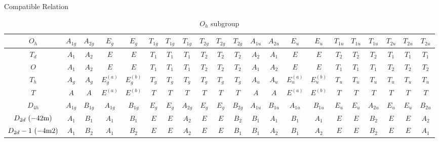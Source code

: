 \documentclass[fleqn,10pt,landscape]{jsarticle}
\begin{document}
\setcounter{MaxMatrixCols}{16}

\begin{center}
\LARGE
Compatible Relation
\end{center}
\begin{table}[ht!]
\begin{center}
\caption{$O_{h}$ subgroup}
\renewcommand{\arraystretch}{1.0}
\begin{tabular}{ccccccccccccccccccccc} \hline \hline
$ O_{h} $ & $ A_{1g} $ & $ A_{2g} $ & $ E_{g} $ & $ E_{g} $ & $ T_{1g} $ & $ T_{1g} $ & $ T_{1g} $ & $ T_{2g} $ & $ T_{2g} $ & $ T_{2g} $ & $ A_{1u} $ & $ A_{2u} $ & $ E_{u} $ & $ E_{u} $ & $ T_{1u} $ & $ T_{1u} $ & $ T_{1u} $ & $ T_{2u} $ & $ T_{2u} $ & $ T_{2u} $ \\ \hline
$ T_{d} $ & $ A_{1} $ & $ A_{2} $ & $ E $ & $ E $ & $ T_{1} $ & $ T_{1} $ & $ T_{1} $ & $ T_{2} $ & $ T_{2} $ & $ T_{2} $ & $ A_{2} $ & $ A_{1} $ & $ E $ & $ E $ & $ T_{2} $ & $ T_{2} $ & $ T_{2} $ & $ T_{1} $ & $ T_{1} $ & $ T_{1} $ \\
$ O $ & $ A_{1} $ & $ A_{2} $ & $ E $ & $ E $ & $ T_{1} $ & $ T_{1} $ & $ T_{1} $ & $ T_{2} $ & $ T_{2} $ & $ T_{2} $ & $ A_{1} $ & $ A_{2} $ & $ E $ & $ E $ & $ T_{1} $ & $ T_{1} $ & $ T_{1} $ & $ T_{2} $ & $ T_{2} $ & $ T_{2} $ \\
$ T_{h} $ & $ A_{g} $ & $ A_{g} $ & $ E_{g}^{(a)} $ & $ E_{g}^{(b)} $ & $ T_{g} $ & $ T_{g} $ & $ T_{g} $ & $ T_{g} $ & $ T_{g} $ & $ T_{g} $ & $ A_{u} $ & $ A_{u} $ & $ E_{u}^{(a)} $ & $ E_{u}^{(b)} $ & $ T_{u} $ & $ T_{u} $ & $ T_{u} $ & $ T_{u} $ & $ T_{u} $ & $ T_{u} $ \\
$ T $ & $ A $ & $ A $ & $ E^{(a)} $ & $ E^{(b)} $ & $ T $ & $ T $ & $ T $ & $ T $ & $ T $ & $ T $ & $ A $ & $ A $ & $ E^{(a)} $ & $ E^{(b)} $ & $ T $ & $ T $ & $ T $ & $ T $ & $ T $ & $ T $ \\
$ D_{4h} $ & $ A_{1g} $ & $ B_{1g} $ & $ A_{1g} $ & $ B_{1g} $ & $ E_{g} $ & $ E_{g} $ & $ A_{2g} $ & $ E_{g} $ & $ E_{g} $ & $ B_{2g} $ & $ A_{1u} $ & $ B_{1u} $ & $ A_{1u} $ & $ B_{1u} $ & $ E_{u} $ & $ E_{u} $ & $ A_{2u} $ & $ E_{u} $ & $ E_{u} $ & $ B_{2u} $ \\
$ D_{2d}\,\, ({\rm -42m}) $ & $ A_{1} $ & $ B_{1} $ & $ A_{1} $ & $ B_{1} $ & $ E $ & $ E $ & $ A_{2} $ & $ E $ & $ E $ & $ B_{2} $ & $ B_{1} $ & $ A_{1} $ & $ B_{1} $ & $ A_{1} $ & $ E $ & $ E $ & $ B_{2} $ & $ E $ & $ E $ & $ A_{2} $ \\
$ D_{2d}-1\,\, ({\rm -4m2}) $ & $ A_{1} $ & $ B_{2} $ & $ A_{1} $ & $ B_{2} $ & $ E $ & $ E $ & $ A_{2} $ & $ E $ & $ E $ & $ B_{1} $ & $ B_{1} $ & $ A_{2} $ & $ B_{1} $ & $ A_{2} $ & $ E $ & $ E $ & $ B_{2} $ & $ E $ & $ E $ & $ A_{1} $ \\

\end{tabular}
\end{center}
\end{table}
\end{document}
